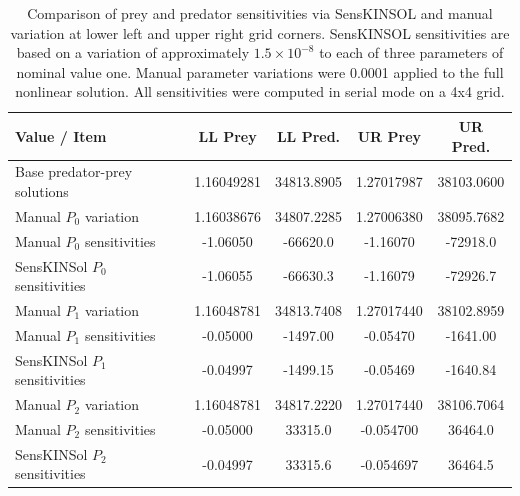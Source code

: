 \documentclass[11pt]{article}
\begin{document}
\begin{table}
\center
\small
\caption{Comparison of prey and predator sensitivities via SensKINSOL
and manual variation at lower left and upper right grid corners.
SensKINSOL sensitivities are based on a variation of approximately
$1.5\times10^{-8}$ to each of three parameters of nominal value one.
Manual parameter variations were 0.0001 applied to the full nonlinear
solution. All sensitivities were computed in serial mode on a 4x4
grid.}
\vspace{6 pt}
\label{pred_prey}
\renewcommand{\arraystretch}{1.35}
\begin{tabular}{|l|c|c|c|c|}
\hline
Value / Item                    &    LL Prey  &   LL Pred.  &    UR Prey  &   UR Pred. \\
\hline \hline
Base predator-prey solutions    &  1.16049281 &  34813.8905 &  1.27017987 &  38103.0600 \\
\hline
Manual $P_0$ variation          &  1.16038676 &  34807.2285 &  1.27006380 &  38095.7682 \\
\hline
Manual $P_0$ sensitivities      & -1.06050    & -66620.0    & -1.16070    & -72918.0 \\
\hline
SensKINSol $P_0$ sensitivities  & -1.06055    & -66630.3    & -1.16079    & -72926.7 \\
\hline
Manual $P_1$ variation          &  1.16048781 &  34813.7408 &  1.27017440 &  38102.8959 \\
\hline
Manual $P_1$ sensitivities      & -0.05000    & -1497.00    & -0.05470    & -1641.00 \\
\hline
SensKINSol $P_1$ sensitivities  & -0.04997    & -1499.15    & -0.05469    & -1640.84 \\
\hline
Manual $P_2$ variation          &  1.16048781 &  34817.2220 &  1.27017440 &  38106.7064 \\
\hline
Manual $P_2$ sensitivities      & -0.05000    &  33315.0    & -0.054700   &  36464.0 \\
\hline
SensKINSol $P_2$ sensitivities  & -0.04997    &  33315.6    & -0.054697   &  36464.5 \\
\hline
\end{tabular}
\end{table}
\end{document}
